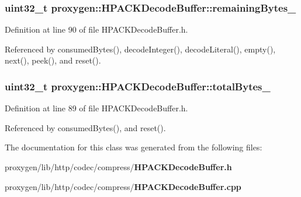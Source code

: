\subsubsection[{remaining\+Bytes\+\_\+}]{\setlength{\rightskip}{0pt plus 5cm}uint32\+\_\+t proxygen\+::\+H\+P\+A\+C\+K\+Decode\+Buffer\+::remaining\+Bytes\+\_\+\hspace{0.3cm}{\ttfamily [private]}}\label{classproxygen_1_1HPACKDecodeBuffer_a3d2fe4fe3b9527081bfd5116b45f7905}


Definition at line 90 of file H\+P\+A\+C\+K\+Decode\+Buffer.\+h.



Referenced by consumed\+Bytes(), decode\+Integer(), decode\+Literal(), empty(), next(), peek(), and reset().

\subsubsection[{total\+Bytes\+\_\+}]{\setlength{\rightskip}{0pt plus 5cm}uint32\+\_\+t proxygen\+::\+H\+P\+A\+C\+K\+Decode\+Buffer\+::total\+Bytes\+\_\+\hspace{0.3cm}{\ttfamily [private]}}\label{classproxygen_1_1HPACKDecodeBuffer_abdc098cf010a52fac3c467e37f4b98bb}


Definition at line 89 of file H\+P\+A\+C\+K\+Decode\+Buffer.\+h.



Referenced by consumed\+Bytes(), and reset().



The documentation for this class was generated from the following files\+:\begin{DoxyCompactItemize}
\item 
proxygen/lib/http/codec/compress/{\bf H\+P\+A\+C\+K\+Decode\+Buffer.\+h}\item 
proxygen/lib/http/codec/compress/{\bf H\+P\+A\+C\+K\+Decode\+Buffer.\+cpp}\end{DoxyCompactItemize}
